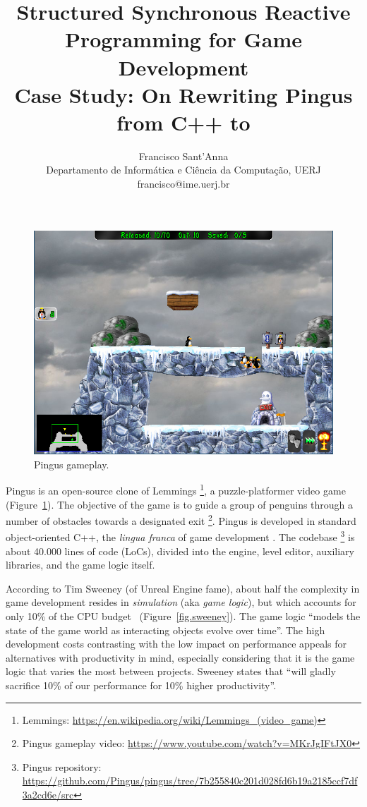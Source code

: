 \documentclass{vgtc}                          %
\title{Structured Synchronous Reactive Programming for Game Development
        \\ \Large{Case Study: On Rewriting Pingus from C++ to \CEU}}
\author{Francisco Sant'Anna
        \\ Departamento de Inform\'atica e Ci\^encia da Computa\c{c}\~ao, UERJ
        \\ francisco@ime.uerj.br}
\begin{document}

\maketitle

\begin{figure}[t]
\centering
\includegraphics[width=\columnwidth]{pingus}
\caption{Pingus gameplay.
\label{fig.pingus}
}
\end{figure}

Pingus is an open-source clone of Lemmings%
\footnote{Lemmings: \url{https://en.wikipedia.org/wiki/Lemmings_(video_game)}},
a puzzle-platformer video game (Figure~\ref{fig.pingus}).      
The objective of the game is to guide a group of penguins through a number of
obstacles towards a designated exit%
\footnote{Pingus gameplay video: \url{https://www.youtube.com/watch?v=MKrJgIFtJX0}}.
%
Pingus is developed in standard object-oriented C++, the \emph{lingua franca}
of game development \cite{games.patterns}.
The codebase%
\footnote{Pingus repository: \url{https://github.com/Pingus/pingus/tree/7b255840c201d028fd6b19a2185ccf7df3a2cd6e/src}}
is about 40.000 lines of code (LoCs), divided into
the engine, level editor, auxiliary libraries, and the game logic itself.

According to Tim Sweeney (of Unreal Engine fame), about half the complexity in
game development resides in \emph{simulation} (aka \emph{game logic}), but
which accounts for only 10\% of the CPU budget~\cite{games.sweeney}
(Figure~\ref{fig.sweeney}).
The game logic ``models the state of the game world as interacting objects
evolve over time''.
The high development costs contrasting with the low impact on performance
appeals for alternatives with productivity in mind, especially considering that
it is the game logic that varies the most between projects.
Sweeney states that ``will gladly sacrifice 10\% of our performance for 10\%
higher productivity''.
\end{document}
